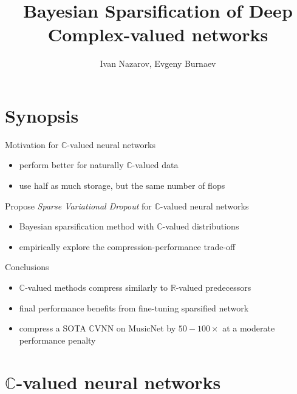 \documentclass{beamer}
\title[Exam]{Bayesian Sparsification of Deep Complex-valued networks}
\author[Nazarov I., Burnaev E.]{Ivan Nazarov, Evgeny Burnaev}
\date{}
\institute[Skoltech]{ADASE Skoltech \\ Moscow, Russia}
\newcommand{\real}{\mathbb{R}}
\newcommand{\cplx}{\mathbb{C}}
\begin{document}
\begin{frame}
  \titlepage

\end{frame}

\section{Synopsis} %
\label{sec:synopsis}

\begin{frame}[c]{\insertsection}
  Motivation for $\cplx$-valued neural networks
  \begin{itemize}
    \item perform better for naturally $\cplx$-valued data
    \item use half as much storage, but the same number of flops
  \end{itemize}

  \pause
  \medskip
  Propose \emph{Sparse Variational Dropout} for $\cplx$-valued neural networks
  \begin{itemize}
    \item Bayesian sparsification method with $\cplx$-valued distributions 
    \item empirically explore the compression-performance trade-off
  \end{itemize}

  \pause
  \medskip
  Conclusions
  \begin{itemize}
    \item $\cplx$-valued methods compress similarly to $\real$-valued predecessors
    \item final performance benefits from fine-tuning sparsified network
    \item compress a SOTA $\cplx$VNN on MusicNet by $50-100\times$ at a moderate performance penalty
  \end{itemize}

\end{frame}


\section{$\cplx$-valued neural networks} %
\label{sec:complex_valued_networks}
\end{document}

